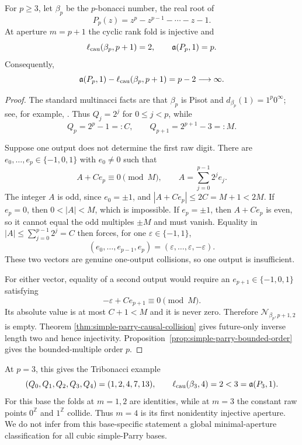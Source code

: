 \begin{corollary}
\label{cor:pbonacci-unbounded-separation}
For $p\ge3$, let $\beta_p$ be the $p$-bonacci number, the real root of
\[
P_p(z)=z^p-z^{p-1}-\cdots-z-1.
\]
At aperture $m=p+1$ the cyclic rank fold is injective and
\[
\ell_{\rm cau}(\beta_p,p+1)=2,
\qquad
\mathfrak a(P_p,1)=p.
\]
Consequently,
\[
\mathfrak a(P_p,1)-\ell_{\rm cau}(\beta_p,p+1)=p-2\longrightarrow\infty.
\]
\end{corollary}

\begin{proof}
The standard multinacci facts are that $\beta_p$ is Pisot and
$d_{\beta_p}(1)=1^p0^\infty$; see, for example, \cite{Kalle2014}.  Thus
$Q_j=2^j$ for $0\le j<p$, while
\[
Q_p=2^p-1=:C,
\qquad
Q_{p+1}=2^{p+1}-3=:M.
\]

Suppose one output does not determine the first raw digit.  There are
$e_0,\ldots,e_p\in\{-1,0,1\}$ with $e_0\ne0$ such that
\[
A+Ce_p\equiv0\pmod M,
\qquad
A=\sum_{j=0}^{p-1}2^je_j.
\]
The integer $A$ is odd, since $e_0=\pm1$, and
$|A+Ce_p|\le2C=M+1<2M$.  If $e_p=0$, then $0<|A|<M$, which is impossible.
If $e_p=\pm1$, then $A+Ce_p$ is even, so it cannot equal the odd multiples
$\pm M$ and must vanish.  Equality in
$|A|\le\sum_{j=0}^{p-1}2^j=C$ then forces, for one
$\varepsilon\in\{-1,1\}$,
\[
(e_0,\ldots,e_{p-1},e_p)
=(\varepsilon,\ldots,\varepsilon,-\varepsilon).
\]
These two vectors are genuine one-output collisions, so one output is
insufficient.

For either vector, equality of a second output would require an
$e_{p+1}\in\{-1,0,1\}$ satisfying
\[
-\varepsilon+Ce_{p+1}\equiv0\pmod M.
\]
Its absolute value is at most $C+1<M$ and it is never zero.  Therefore
$\mathcal N_{\beta_p,p+1,2}$ is empty.  Theorem
\ref{thm:simple-parry-causal-collision} gives future-only inverse length two and hence
injectivity.  Proposition~\ref{prop:simple-parry-bounded-order} gives the
bounded-multiple order $p$.
\end{proof}

At $p=3$, this gives the Tribonacci example
\[
(Q_0,Q_1,Q_2,Q_3,Q_4)=(1,2,4,7,13),
\qquad
\ell_{\rm cau}(\beta_3,4)=2<3=\mathfrak a(P_3,1).
\]
For this base the folds at $m=1,2$ are identities, while at $m=3$ the
constant raw points $0^{\mathbb Z}$ and $1^{\mathbb Z}$ collide.  Thus
$m=4$ is its first nonidentity injective aperture.  We do not infer from this
base-specific statement a global minimal-aperture classification for all
cubic simple-Parry bases.

